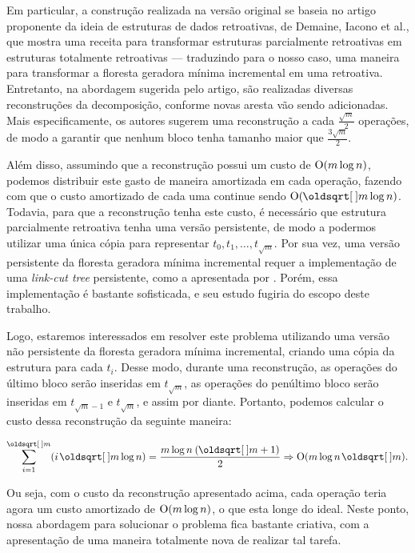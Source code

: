 Em particular, a construção realizada na versão original se baseia no artigo proponente da ideia de estruturas de dados retroativas, de Demaine, Iacono et al., que mostra uma receita para transformar estruturas parcialmente retroativas em estruturas totalmente retroativas --- traduzindo para o nosso caso, uma maneira para transformar a floresta geradora mínima incremental em uma retroativa. Entretanto, na abordagem sugerida pelo artigo, são realizadas diversas reconstruções da decomposição, conforme novas aresta vão sendo adicionadas. Mais especificamente, os autores sugerem uma reconstrução a cada $\frac{\sqrt{m}}{2}$ operações, de modo a garantir que nenhum bloco tenha tamanho maior que $\frac{3\sqrt{m}}{2}$.

Além disso, assumindo que a reconstrução possui um custo de $\mathrm{O}(m \log n)$, podemos distribuir este gasto de maneira amortizada em cada operação, fazendo com que o custo amortizado de cada uma continue sendo $\Oh(\sqrt{m} \log n)$. Todavia, para que a reconstrução tenha este custo, é necessário que estrutura parcialmente retroativa tenha uma versão persistente, de modo a  podermos utilizar uma única cópia para representar $t_0, t_1, \dots, t_{\sqrt{m}}$. Por sua vez, uma versão persistente da floresta geradora mínima incremental requer a implementação de uma \emph{link-cut tree} persistente, como a apresentada por \citet{10.1007/978-3-540-69903-3_16}. Porém, essa implementação é bastante sofisticada, e seu estudo fugiria do escopo deste trabalho.

Logo, estaremos interessados em resolver este problema utilizando uma versão não persistente da floresta geradora mínima incremental, criando uma cópia da estrutura para cada $t_i$. Desse modo, durante uma reconstrução, as operações do último bloco serão inseridas em $t_{\sqrt{m}}$, as operações do penúltimo bloco serão inseridas em $t_{\sqrt{m} - 1}$ e $t_{\sqrt{m}}$, e assim por diante. Portanto, podemos calcular o custo dessa reconstrução da seguinte maneira:

\begin{equation}
    \sum_{i=1}^{\sqrt{m}} (i \sqrt{m} \log n) =
    \frac{m \log n \: (\sqrt{m} + 1)}{2} \Rightarrow
    \Oh(m \log n \sqrt{m}).
\end{equation}

Ou seja, com o custo da reconstrução apresentado acima, cada operação teria agora um custo amortizado de $\mathrm{O}(m \log n)$, o que esta longe do ideal. Neste ponto, nossa abordagem para solucionar o problema fica bastante criativa, com a apresentação de uma maneira totalmente nova de realizar tal tarefa.


